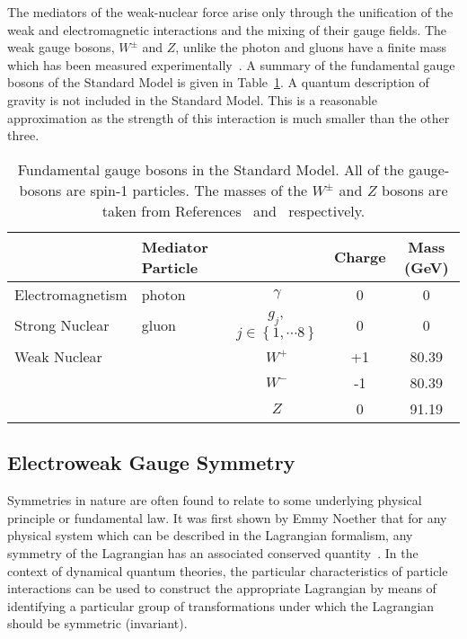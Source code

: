 The mediators of the weak-nuclear force arise only through 
the unification of the weak and electromagnetic interactions and the mixing
of their gauge fields. 
The weak gauge bosons, $W^{\pm}$ and $Z$, unlike the photon and gluons 
have a finite mass which has been measured experimentally~\citep{combinedWmass,pdg}.
A summary of the fundamental gauge bosons of the Standard Model is given in 
Table~\ref{tab:bosons}. A quantum description of gravity is not included in the Standard Model.
This is a reasonable approximation as the strength of this interaction 
is much smaller than the other three.
\begin{table}[htbp!]
\begin{tabular}{|l|l c|c|c|}
\hline 
	& \textbf{Mediator Particle} & & \textbf{Charge} & \textbf{Mass (GeV)} \\
\hline
Electromagnetism & photon & $\gamma$ 			& 0 & 0   \\
\hline
Strong Nuclear   & gluon  & $g_{j},$ $j\in\left\{1,\cdots8\right\}$ 	& 0 & 0   \\
\hline
Weak Nuclear 	 &  &  $W^{+}$ & +1 & 80.39 \\
	 	 &  &  $W^{-}$ & -1 & 80.39 \\
	 	 &  &  $Z$     & 0  & 91.19 \\
\hline
\end{tabular}
\caption{Fundamental gauge bosons in the Standard Model.
All of the gauge-bosons are spin-1 particles.
The masses of the $W^{\pm}$ and $Z$ bosons are taken from 
References~\citep{combinedWmass} and~\citep{pdg} respectively.}
\label{tab:bosons}
\end{table}

\subsection{Electroweak Gauge Symmetry}
\label{sec:ewksymmetry}

Symmetries in nature are often found to relate to some underlying physical principle 
or fundamental law. It was first shown by Emmy Noether 
that for any physical system which can be described in the Lagrangian formalism,
any symmetry of the Lagrangian has an associated conserved quantity~\cite{noether}.
In the context of dynamical quantum theories, the particular characteristics of 
particle interactions can be used to construct the appropriate Lagrangian 
by means of identifying a particular group of transformations under which 
the Lagrangian should be symmetric (invariant). 

